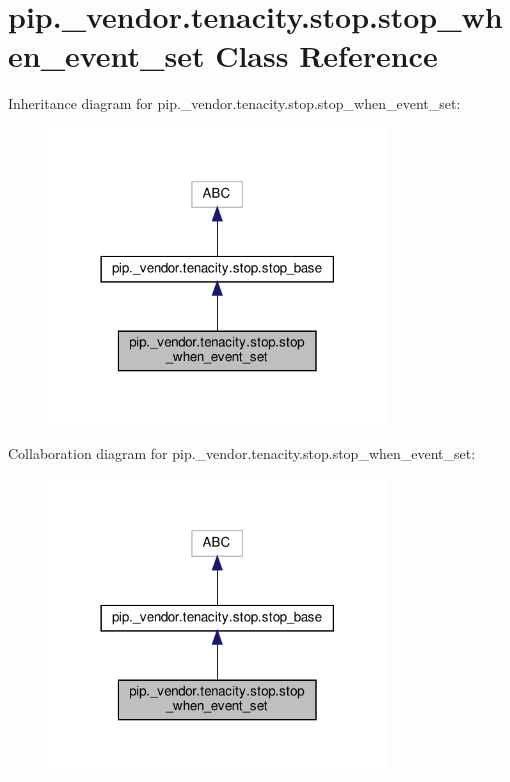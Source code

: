 \hypertarget{classpip_1_1__vendor_1_1tenacity_1_1stop_1_1stop__when__event__set}{}\section{pip.\+\_\+vendor.\+tenacity.\+stop.\+stop\+\_\+when\+\_\+event\+\_\+set Class Reference}
\label{classpip_1_1__vendor_1_1tenacity_1_1stop_1_1stop__when__event__set}


Inheritance diagram for pip.\+\_\+vendor.\+tenacity.\+stop.\+stop\+\_\+when\+\_\+event\+\_\+set\+:
\nopagebreak
\begin{figure}[H]
\begin{center}
\leavevmode
\includegraphics[width=254pt]{classpip_1_1__vendor_1_1tenacity_1_1stop_1_1stop__when__event__set__inherit__graph}
\end{center}
\end{figure}


Collaboration diagram for pip.\+\_\+vendor.\+tenacity.\+stop.\+stop\+\_\+when\+\_\+event\+\_\+set\+:
\nopagebreak
\begin{figure}[H]
\begin{center}
\leavevmode
\includegraphics[width=254pt]{classpip_1_1__vendor_1_1tenacity_1_1stop_1_1stop__when__event__set__coll__graph}
\end{center}
\end{figure}
